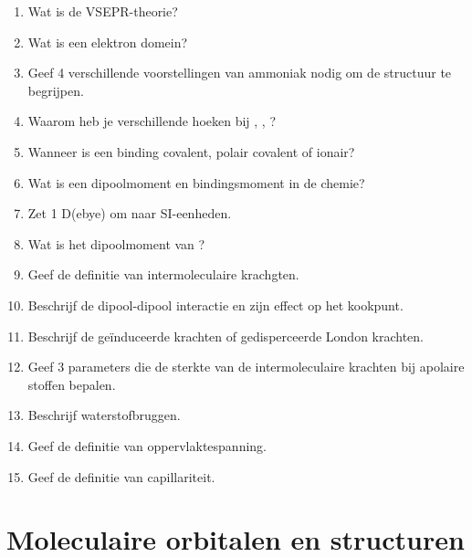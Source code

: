 \documentclass[a4paper,12pt]{article}
\begin{document}
    \begin{enumerate}
        \item Wat is de VSEPR-theorie?
        \item Wat is een elektron domein?
        \item Geef 4 verschillende voorstellingen van ammoniak nodig om de structuur te begrijpen.
        \item Waarom heb je verschillende hoeken bij , , ?
        \item Wanneer is een binding covalent, polair covalent of ionair?
        \item Wat is een dipoolmoment en bindingsmoment in de chemie?
        \item Zet 1 D(ebye) om naar SI-eenheden.
        \item Wat is het dipoolmoment van ?
        \item Geef de definitie van intermoleculaire krachgten.
        \item Beschrijf de dipool-dipool interactie en zijn effect op het kookpunt.
        \item Beschrijf de ge\"induceerde krachten of gedisperceerde London krachten.
        \item Geef 3 parameters die de sterkte van de intermoleculaire krachten bij apolaire stoffen bepalen.
        \item Beschrijf waterstofbruggen.
        \item Geef de definitie van oppervlaktespanning.
        \item Geef de definitie van capillariteit.
    \end{enumerate}

    \section{Moleculaire orbitalen en structuren}
\end{document}
